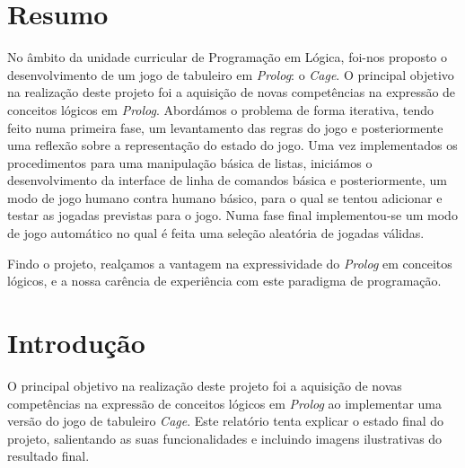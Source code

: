 \documentclass[a4paper]{article}
\begin{document}

\newpage

\section*{Resumo}
No âmbito da unidade curricular de Programação em Lógica, foi-nos proposto o desenvolvimento de um jogo de tabuleiro em \emph{Prolog}: o \emph{Cage}. O principal objetivo na realização deste projeto foi a aquisição de novas competências na expressão de conceitos lógicos em \emph{Prolog}. Abordámos o problema de forma iterativa, tendo feito numa primeira fase, um levantamento das regras do jogo e posteriormente uma reflexão sobre a representação do estado do jogo. Uma vez implementados os procedimentos para uma manipulação básica de listas, iniciámos o desenvolvimento da interface de linha de comandos básica e posteriormente, um modo de jogo humano contra humano básico, para o qual se tentou adicionar e testar as jogadas previstas para o jogo. Numa fase final implementou-se um modo de jogo automático no qual é feita uma seleção aleatória de jogadas válidas.   

Findo o projeto, realçamos a vantagem na expressividade do \emph{Prolog} em conceitos lógicos, e a nossa carência de experiência com este paradigma de programação.

\newpage

\tableofcontents



\newpage

\section{Introdução}

O principal objetivo na realização deste projeto foi a aquisição de novas competências na expressão de conceitos lógicos em \emph{Prolog} ao implementar uma versão do jogo de tabuleiro \emph{Cage}. Este relatório tenta explicar o estado final do projeto, salientando as suas funcionalidades e incluindo imagens ilustrativas do resultado final.
\end{document}
